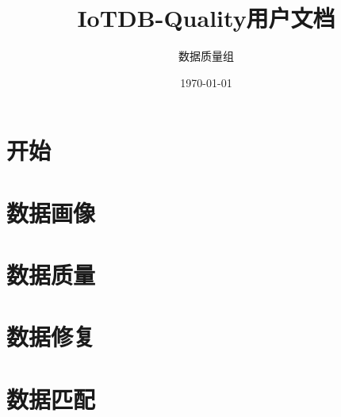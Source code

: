 \documentclass[cn,11pt,mode=simple,table]{elegantbook}
\title{IoTDB-Quality用户文档}
\author{数据质量组}
\institute{清华大学软件学院}
\date{\today}
\begin{document}
\maketitle
\tableofcontents
\mainmatter

\chapter{开始}




\chapter{数据画像}
























\chapter{数据质量}





\chapter{数据修复}





\chapter{数据匹配}









\end{document}
